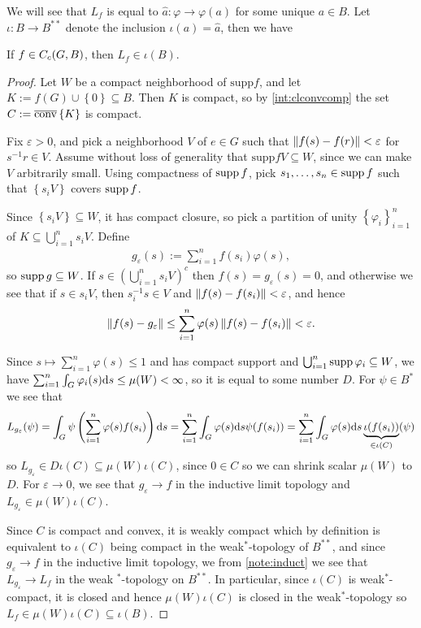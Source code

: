 We will see that $L_f$ is equal to $\hat a \colon \varphi \to \varphi(a)$ for some unique $a \in B$. Let $\iota \colon B \to B^{**}$ denote the inclusion $\iota(a) = \hat a$, then we have
\begin{lemma}
	If $f \in C_c(G,B)$, then $L_f \in \iota(B)$.
	\label{int:defintegral}
\end{lemma}
\begin{proof}
	Let $W$ be a compact neighborhood of $\mathrm{supp} f$, and let $K:= f(G) \cup \left\{ 0 \right\} \subseteq B$. Then $K$ is compact, so by \ref{int:clconvcomp} the set $C := \overline {\operatorname{conv}} \left\{ K \right\}$ is compact.

	Fix $\varepsilon > 0$, and pick a neighborhood $V$ of $e \in G$ such that $ \left\lVert f(s) - f(r) \right\rVert < \varepsilon$ for $s^{-1}r \in V$. Assume without loss of generality that $\mathrm{supp} f V \subseteq W$, since we can make $V$ arbitrarily small. Using compactness of $\operatorname{supp} f$, pick $s_1,\dots,s_n \in \operatorname{supp} f$ such that $\left\{ s_i V \right\}$ covers $\operatorname{supp} f$.
	
	Since $ \left\{ s_i V \right\} \subseteq W$, it has compact closure, so pick a partition of unity $\left\{ \varphi_i \right\}_{i=1}^n$ of $ K \subseteq \bigcup_{i=1}^n s_i V$. Define 
	\begin{align*}
		g_\varepsilon (s) := \sum_{i=1}^n f(s_i) \varphi(s),
	\end{align*}
	so $\operatorname{supp} g \subseteq W$. If $s \in \left( \bigcup_{i=1}^n s_i V \right)^c$ then $f(s) = g_{\varepsilon}(s) = 0$, and otherwise we see that if $s \in s_i V$, then $s_i^{-1}s \in V$ and $\left\lVert f(s) - f(s_i) \right\rVert < \varepsilon$, and hence
	\begin{align*}
		\left\lVert f(s) - g_{\varepsilon} \right\rVert  \leq \sum_{i=1}^n \varphi(s) \left\lVert f(s)-f(s_i) \right\rVert  < \varepsilon.
	\end{align*}

	Since $s \mapsto \sum_{i=1}^n \varphi(s) \leq 1$ and has compact support and $\bigcup_{i=1}^n \operatorname{supp} \varphi_i \subseteq W$, we have $\sum_{i=1}^n \int_G \varphi_i(s) \mathrm{d} s \leq \mu(W) < \infty$, so it is equal to some number $D$. For $\psi \in B^*$ we see that
	\begin{align*}
		L_{g_{\varepsilon}} ( \psi ) = \int_{G} \psi\left( \sum_{i=1}^n \varphi(s) f(s_i) \right) \mathrm{d} s = \sum_{i=1}^n \int_G \varphi(s) \mathrm{d} s \psi(f(s_i)) = \sum_{i=1}^n \int_G \varphi(s) \mathrm{d} s \underbrace{\iota(f(s_i))}_{ \in \iota(C)} (\psi) 
	\end{align*}
	so $L_{g_{\varepsilon}}  \in D \iota(C) \subseteq \mu(W) \iota(C)$, since $0 \in C$ so we can shrink scalar $\mu(W)$ to $D$. For $\varepsilon \to 0$, we see that $g_{\varepsilon} \to f$ in the inductive limit topology and $L_{g_\varepsilon} \in \mu(W) \iota(C)$. 

	Since $C$ is compact and convex, it is weakly compact which by definition is equivalent to $\iota(C)$ being compact in the weak$^*$-topology of $B^{**}$, and since $g_{\varepsilon} \to f$ in the inductive limit topology, we from \ref{note:induct} we see that $L_{g_\varepsilon } \to L_f$ in the weak $^*$-topology on $B^{**}$. In particular, since $\iota(C)$ is weak$^*$-compact, it is closed and hence $\mu(W) \iota(C)$ is closed in the weak$^*$-topology so $L_f \in \mu(W) \iota(C) \subseteq \iota(B)$.
\end{proof}
